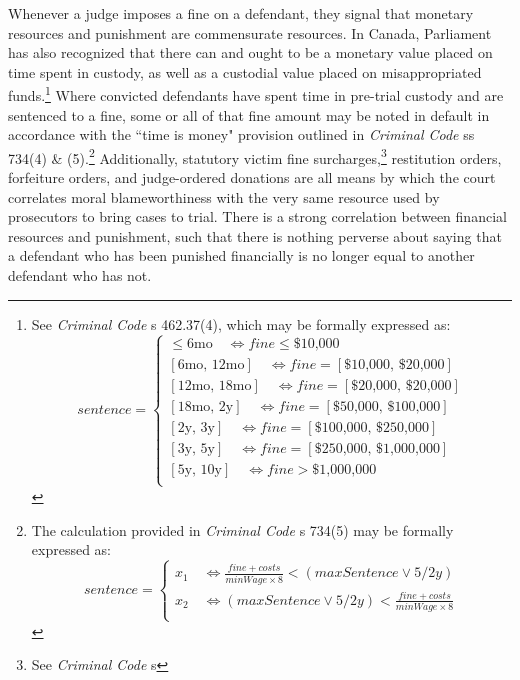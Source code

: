 Whenever a judge imposes a fine on a defendant, they signal that monetary resources and punishment are commensurate resources. In Canada, Parliament has also recognized that there can and ought to be a monetary value placed on time spent in custody, as well as a custodial value placed on misappropriated funds.\footnote{See \textit{Criminal Code} s 462.37(4), which may be formally expressed as: 
\begin{equation*}
    sentence = \begin{cases}
        \le \text{6mo} \quad  \iff fine \le \text{\$10,000} \\
	[\text{6mo, 12mo}] \quad \iff fine = [\text{\$10,000, \$20,000}]\\
	[\text{12mo, 18mo}] \quad \iff fine = [\text{\$20,000, \$20,000}]\\
	[\text{18mo, 2y}] \quad \iff fine = [\text{\$50,000, \$100,000}]\\
	[\text{2y, 3y}] \quad \iff fine = [\text{\$100,000, \$250,000}]\\
	[\text{3y, 5y}] \quad \iff fine = [\text{\$250,000, \$1,000,000}]\\
	[\text{5y, 10y}] \quad \iff fine > \text{\$1,000,000}\\
    \end{cases}
\end{equation*}} 
Where convicted defendants have spent time in pre-trial custody and are sentenced to a fine, some or all of that fine amount may be noted in default in accordance with the ``time is money" provision outlined in \textit{Criminal Code} ss 734(4) \& (5).\footnote{The calculation provided in \textit{Criminal Code} s 734(5) may be formally expressed as: 
\begin{equation*}
    sentence =\begin{cases}
        x_1 \quad  \iff \frac{fine + costs}{minWage \times 8} < (maxSentence \lor 5/2y) \\
        x_2 \quad \iff (maxSentence \lor 5/2y) < \frac{fine + costs}{minWage \times 8}  \\
    \end{cases}
\end{equation*}}
Additionally, statutory victim fine surcharges,\footnote{See \textit{Criminal Code} s } restitution orders, forfeiture orders, and judge-ordered donations are all means by which the court correlates moral blameworthiness with the very same resource used by prosecutors to bring cases to trial. There is a strong correlation between financial resources and punishment, such that there is nothing perverse about saying that a defendant who has been punished financially is no longer equal to another defendant who has not.

